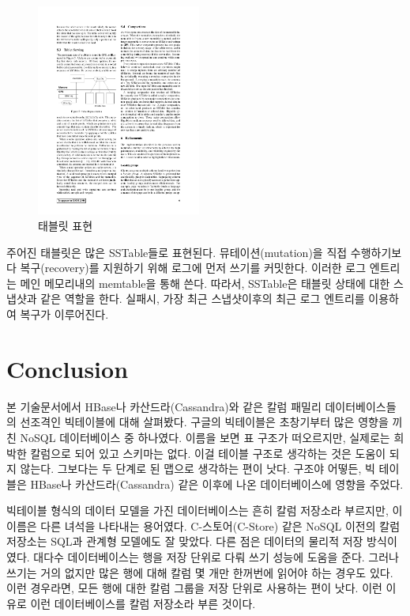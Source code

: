 \documentclass[twocolumn]{article}
\begin{document}
\begin{figure}[htb]
        \centering
        \includegraphics[width=0.48\textwidth]{sstable}
        \caption{    태블릿 표현}
        \label{fig:sstable}
\end{figure}

주어진 태블릿은 많은 SSTable들로 표현된다. 뮤테이션(mutation)을 직접 수행하기보다 복구(recovery)를 지원하기 위해 로그에 먼저 쓰기를 커밋한다. 이러한 로그 엔트리는 메인 메모리내의 memtable을 통해 쓴다. 따라서, SSTable은 태블릿 상태에 대한 스냅샷과 같은 역할을 한다. 
실패시, 가장 최근 스냅샷이후의 최근 로그 엔트리를 이용하여 복구가 이루어진다.



\section{Conclusion}
본 기술문서에서 HBase나 카산드라(Cassandra)와 같은 칼럼 패밀리 데이터베이스들의 선조격인 빅테이블에 대해 살펴봤다.
구글의 빅테이블은 초창기부터 많은 영향을 끼친 NoSQL 데이터베이스 중 하나였다. 이름을 보면 표 구조가 떠오르지만, 실제로는 희박한 칼럼으로 되어 있고 스키마는 없다. 이걸 테이블 구조로 생각하는 것은 도움이 되지 않는다. 그보다는 두 단계로 된 맵으로 생각하는 편이 낫다.
구조야 어떻든, 빅 테이블은 HBase나 카산드라(Cassandra) 같은 이후에 나온 데이터베이스에 영향을 주었다.

빅테이블 형식의 데이터 모델을 가진 데이터베이스는 흔히 칼럼 저장소라 부르지만, 이 이름은 다른 녀석을 나타내는 용어였다. 
C-스토어(C-Store) 같은 NoSQL 이전의 칼럼 저장소는 SQL과 관계형 모델에도 잘 맞았다. 다른 점은 데이터의 물리적 저장 방식이였다.
대다수 데이터베이스는 행을 저장 단위로 다뤄 쓰기 성능에 도움을 준다. 그러나 쓰기는 거의 없지만 많은 행에 대해 칼럼 몇 개만 한꺼번에 읽어야 하는 경우도 있다. 이런 경우라면, 모든 행에 대한 칼럼 그룹을 저장 단위로 사용하는 편이 낫다. 이런 이유로 이런 데이터베이스를 칼럼 저장소라 부른 것이다.
\end{document}
